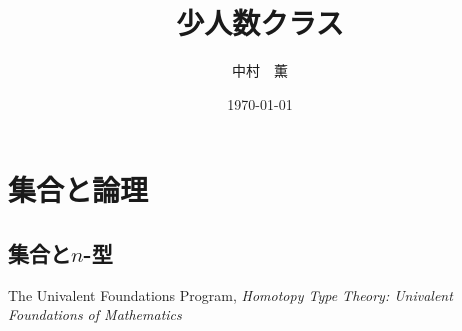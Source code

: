 \documentclass[11pt]{jarticle}
\theoremstyle{mystyle}
\newcommand{\0}{\textbf{0}}
\newcommand{\1}{\textbf{1}}
\newcommand{\2}{\textbf{2}}
\begin{document}
\title{少人数クラス}
\author{中村　薫}
\date{\today}
\maketitle
\tableofcontents
\setcounter{section}{2}
\section{集合と論理}
\setcounter{subsection}{0}
\subsection{集合と$n$-型}
\begin{thebibliography}{9}
     The Univalent Foundations Program, 
        {\it{Homotopy Type Theory: Univalent Foundations of Mathematics}}
  \end{thebibliography}
\end{document}
